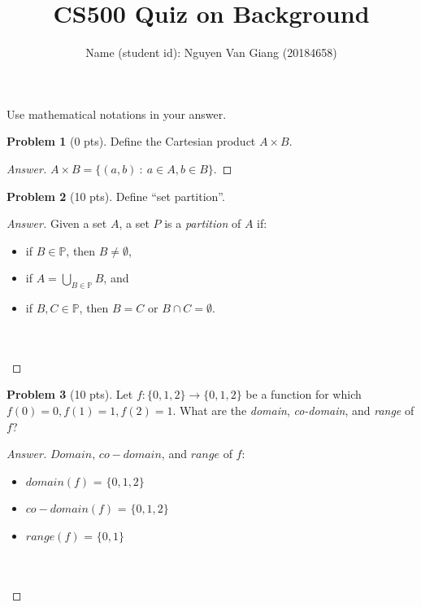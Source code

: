 \documentclass[11pt,a4paper,oneside,microtype,nokorean]{oblivoir}
\theoremstyle{definition}
\newtheorem{problem}{Problem}
\begin{document}
\title{CS500 Quiz on Background}
\author{Name (student id): Nguyen Van Giang (20184658) }
\maketitle

\noindent Use mathematical notations in your answer.

\begin{problem}[0 pts]
  Define the Cartesian product $A \times B$.
\end{problem}
\begin{proof}[Answer]
  $A \times B = \{(a,b)~:~a \in A, b \in B\}$.
\end{proof}


\begin{problem}[10 pts]
  Define ``set partition''.
\end{problem}
\begin{proof}[Answer]
  Given a set $A$, a set $P$ is a \emph{partition} of $A$ if:
  \begin{itemize}
    \item if $ B \in \mathbb{P}$, then $B \neq \emptyset $,
    \item if $ A = \bigcup_{B \in \mathbb{P}}B$, and
    \item if $ B, C \in \mathbb{P}$, then $B = C$ or $B \cap C = \emptyset .$ 
  \\
  \\
  \\
  \end{itemize}
\end{proof}


\begin{problem}[10 pts]
  Let $f: \{0,1,2\} \to \{0,1,2\}$ be a function for which $f(0) = 0, f(1) = 1, f(2) = 1$.  What are
  the \emph{domain}, \emph{co-domain}, and \emph{range} of $f$?
\end{problem}
\begin{proof}[Answer]
$Domain$, $co-domain$, and $range$ of $f$:
  \begin{itemize}
    \item $domain(f)$ = $\{0,1,2\}$
    \item $co-domain(f)$ = $\{0,1,2\}$
    \item $range(f)$ = $\{0,1\}$
  \\ 
  \\
  \\
  \end{itemize}
\end{proof}
\end{document}
